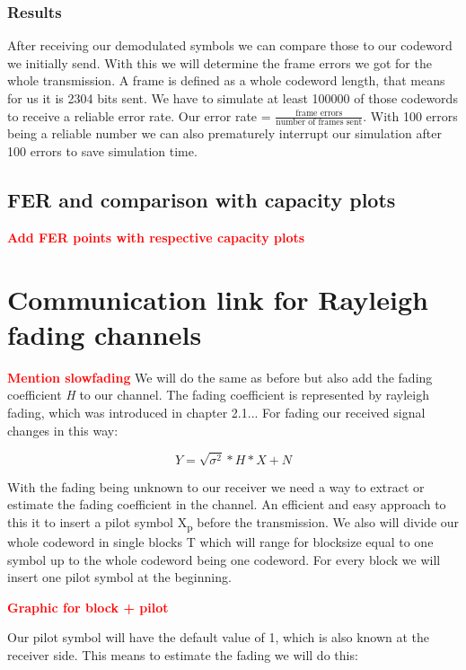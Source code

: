 \documentclass[12pt,oneside, reqno]{report}
\newcommand\boldred[1]{\textcolor{red}{\textbf{#1}}}
\begin{document}
\subsection{Results}

After receiving our demodulated symbols we can compare those to our codeword we initially send. With this we will determine the frame errors we got for the whole transmission. A frame is defined as a whole codeword length, that means for us it is 2304 bits sent. We have to simulate at least 100000 of those codewords to receive a reliable error rate. Our error rate = $\frac{\textrm{frame errors}}{\textrm{number of frames sent}}$. With 100 errors being a reliable number we can also prematurely interrupt our simulation after 100 errors to save simulation time.


\section{FER and comparison with capacity plots}

\boldred{Add FER points with respective capacity plots}


\chapter{Communication link for Rayleigh fading channels}

\boldred{Mention slowfading}
We will do the same as before but also add the fading coefficient \textit{H} to our channel. The fading coefficient is represented by rayleigh fading, which was introduced in chapter 2.1... For fading our received signal changes in this way:

\begin{equation}
\label{eq:fading}
Y= \sqrt{\sigma^2}*H*X + N
\end{equation}

With the fading being unknown to our receiver we need a way to extract or estimate the fading coefficient in the channel. An efficient and easy approach to this it to insert a pilot symbol X\textsubscript{p} before the transmission. We also will divide our whole codeword in single blocks T which will range for blocksize equal to one symbol up to the whole codeword being one codeword. For every block we will insert one pilot symbol at the beginning.

\boldred{Graphic for block + pilot}

Our pilot symbol will have the default value of 1, which is also known at the receiver side. This means to estimate the fading we will do this:
\end{document}
